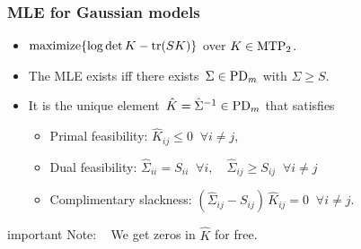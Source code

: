 \documentclass[dvipsnames,aspectratio=169]{beamer} %
\DeclareMathOperator{\tr}{tr}
\newcommand{\mtp}{{\rm MTP}_{2}}
\begin{document}
\begin{frame}
\frametitle{MLE for Gaussian models}
\begin{itemize}
\item ${\rm maximize}\{\log\det K-{\rm tr}(SK)\}$ over $K\in \mtp$.\\[.5cm]
\item The MLE exists iff there exists $\,\Sigma\in {\rm PD}_m$ with $\Sigma\geq S$. \\[.5cm]
\item It is the unique element $\,\hat K = \hat{\Sigma}^{-1}\in {\rm PD}_m$ that satisfies
\begin{itemize}
\item \alert{Primal feasibility:} \;$\hat K_{ij}\leq0\;\; \forall i\neq j,$
\item \alert{Dual feasibility:} \quad $\hat\Sigma_{ii}=S_{ii}\;\; \forall i, \quad \hat\Sigma_{ij}\geq S_{ij}\;\; \forall i\neq j$
\item \alert{Complimentary slackness:} \;\; $(\hat\Sigma_{ij}-S_{ij}) \,\hat K_{ij}= 0 \;\; \forall i\neq j$.
\end{itemize}
\end{itemize}
\begin{beamercolorbox}[wd=\paperwidth,sep=5pt]{important}
	Note: \,\,\, We get zeros in $\hat K$ for free.
\end{beamercolorbox}
\end{frame}
\end{document}
